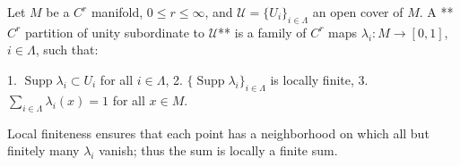 Let $M$ be a $C^r$ manifold, $0 \leq r \leq \infty$, and $\mathcal{U} = \{U_i\}_{i \in \Lambda}$ an open cover of $M$. A **$C^r$ partition of unity subordinate to $\mathcal{U}$** is a family of $C^r$ maps $\lambda_i: M \to [0,1]$, $i \in \Lambda$, such that:

1. $\operatorname{Supp} \lambda_i \subset U_i$ for all $i \in \Lambda$,
2. $\{\operatorname{Supp} \lambda_i\}_{i \in \Lambda}$ is locally finite,
3. $\sum_{i \in \Lambda} \lambda_i(x) = 1$ for all $x \in M$.

Local finiteness ensures that each point has a neighborhood on which all but finitely many $\lambda_i$ vanish; thus the sum is locally a finite sum.
